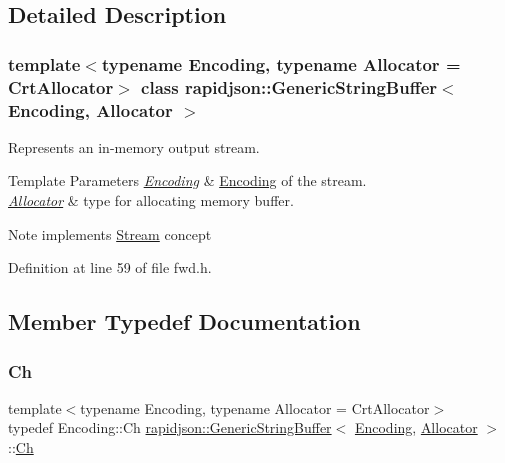 \subsection{Detailed Description}
\subsubsection*{template$<$typename Encoding, typename Allocator = Crt\+Allocator$>$\newline
class rapidjson\+::\+Generic\+String\+Buffer$<$ Encoding, Allocator $>$}

Represents an in-\/memory output stream. 


\begin{DoxyTemplParams}{Template Parameters}
{\em \mbox{\hyperlink{classrapidjson_1_1_encoding}{Encoding}}} & \mbox{\hyperlink{classrapidjson_1_1_encoding}{Encoding}} of the stream. \\
\hline
{\em \mbox{\hyperlink{classrapidjson_1_1_allocator}{Allocator}}} & type for allocating memory buffer. \\
\hline
\end{DoxyTemplParams}
\begin{DoxyNote}{Note}
implements \mbox{\hyperlink{classrapidjson_1_1_stream}{Stream}} concept 
\end{DoxyNote}


Definition at line 59 of file fwd.\+h.



\subsection{Member Typedef Documentation}
\mbox{\label{classrapidjson_1_1_generic_string_buffer_a315f6f4528438a19d5a93eac3e2c99f0}} 
\subsubsection{\texorpdfstring{Ch}{Ch}}
{\footnotesize\ttfamily template$<$typename Encoding, typename Allocator = Crt\+Allocator$>$ \\
typedef Encoding\+::\+Ch \mbox{\hyperlink{classrapidjson_1_1_generic_string_buffer}{rapidjson\+::\+Generic\+String\+Buffer}}$<$ \mbox{\hyperlink{classrapidjson_1_1_encoding}{Encoding}}, \mbox{\hyperlink{classrapidjson_1_1_allocator}{Allocator}} $>$\+::\mbox{\hyperlink{classrapidjson_1_1_generic_string_buffer_a315f6f4528438a19d5a93eac3e2c99f0}{Ch}}}




